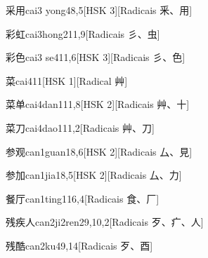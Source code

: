 \begin{entry}{采用}{cai3 yong4}{8,5}[HSK 3][Radicais ⾤、⽤]
\end{entry}

\begin{entry}{彩虹}{cai3hong2}{11,9}[Radicais ⼺、⾍]
\end{entry}

\begin{entry}{彩色}{cai3 se4}{11,6}[HSK 3][Radicais ⼺、⾊]
\end{entry}

\begin{entry}{菜}{cai4}{11}[HSK 1][Radical ⾋]
\end{entry}

\begin{entry}{菜单}{cai4dan1}{11,8}[HSK 2][Radicais ⾋、⼗]
\end{entry}

\begin{entry}{菜刀}{cai4dao1}{11,2}[Radicais ⾋、⼑]
\end{entry}

\begin{entry}{参观}{can1guan1}{8,6}[HSK 2][Radicais ⼛、⾒]
\end{entry}

\begin{entry}{参加}{can1jia1}{8,5}[HSK 2][Radicais ⼛、⼒]
\end{entry}

\begin{entry}{餐厅}{can1ting1}{16,4}[Radicais ⾷、⼚]
\end{entry}

\begin{entry}{残疾人}{can2ji2ren2}{9,10,2}[Radicais ⽍、⽧、⼈]
\end{entry}

\begin{entry}{残酷}{can2ku4}{9,14}[Radicais ⽍、⾣]
\end{entry}

